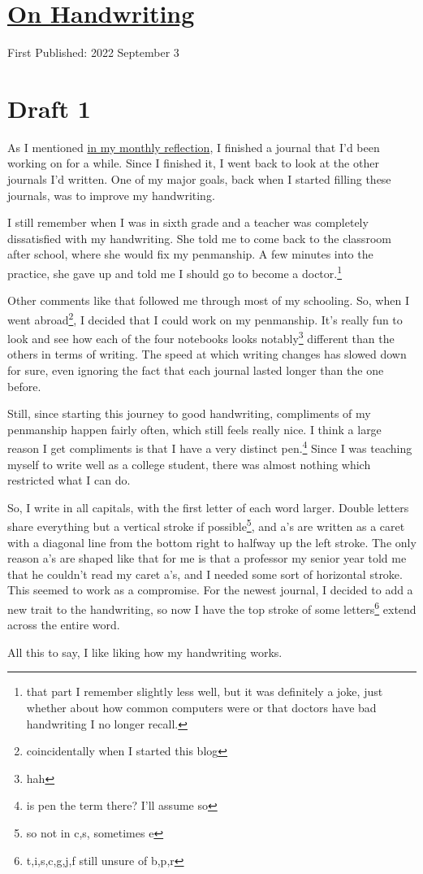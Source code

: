 \documentclass[12pt]{article}[titlepage]
\newcommand{\1}{\={a}}
\newcommand{\2}{\={e}}
\newcommand{\3}{\={\i}}
\newcommand{\4}{\=o}
\newcommand{\5}{\=u}
\newcommand{\6}{\={A}}
\renewcommand{\,}{\textsuperscript{,}}
\begin{document}
\doublespacing
\section{\href{handwriting.html}{On Handwriting}}
First Published: 2022 September 3

\section{Draft 1}
As I mentioned \href{reflection-august-2022.html}{in my monthly reflection}, I finished a journal that I'd been working on for a while.
Since I finished it, I went back to look at the other journals I'd written.
One of my major goals, back when I started filling these journals, was to improve my handwriting.

I still remember when I was in sixth grade and a teacher was completely dissatisfied with my handwriting.
She told me to come back to the classroom after school, where she would fix my penmanship.
A few minutes into the practice, she gave up and told me I should go to become a doctor.\footnote{that part I remember slightly less well, but it was definitely a joke, just whether about how common computers were or that doctors have bad handwriting I no longer recall.}

Other comments like that followed me through most of my schooling.
So, when I went abroad\footnote{coincidentally when I started this blog}, I decided that I could work on my penmanship.
It's really fun to look and see how each of the four notebooks looks notably\footnote{hah} different than the others in terms of writing.
The speed at which writing changes has slowed down for sure, even ignoring the fact that each journal lasted longer than the one before.

Still, since starting this journey to good handwriting, compliments of my penmanship happen fairly often, which still feels really nice.
I think a large reason I get compliments is that I have a very distinct pen.\footnote{is pen the term there? I'll assume so}
Since I was teaching myself to write well as a college student, there was almost nothing which restricted what I can do.

So, I write in all capitals, with the first letter of each word larger.
Double letters share everything but a vertical stroke if possible\footnote{so not in c,s, sometimes e}, and a's are written as a caret with a diagonal line from the bottom right to halfway up the left stroke.
The only reason a's are shaped like that for me is that a professor my senior year told me that he couldn't read my caret a's, and I needed some sort of horizontal stroke.
This seemed to work as a compromise.
For the newest journal, I decided to add a new trait to the handwriting, so now I have the top stroke of some letters\footnote{t,i,s,c,g,j,f still unsure of b,p,r} extend across the entire word.

All this to say, I like liking how my handwriting works.
\end{document}
